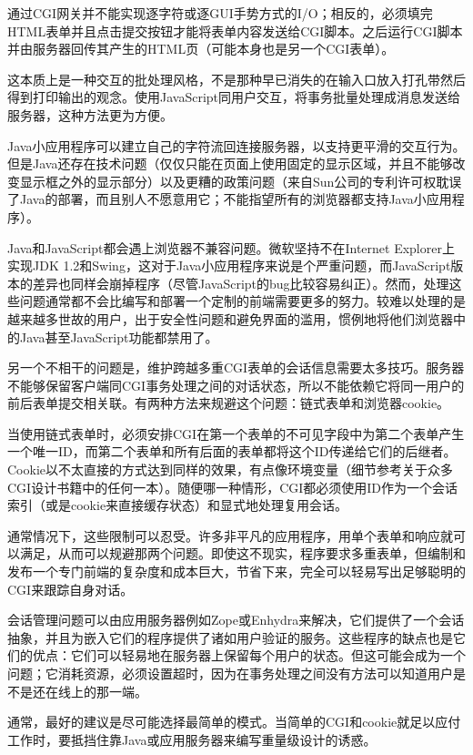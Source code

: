 \documentclass[12pt,oneside]{book}
\begin{document}
通过CGI网关并不能实现逐字符或逐GUI手势方式的I/O；相反的，必须填完HTML表单并且点击提交按钮才能将表单内容发送给CGI脚本。之后运行CGI脚本并由服务器回传其产生的HTML页（可能本身也是另一个CGI表单）。

这本质上是一种交互的批处理风格，不是那种早已消失的在输入口放入打孔带然后得到打印输出的观念。使用JavaScript同用户交互，将事务批量处理成消息发送给服务器，这种方法更为方便。

Java小应用程序可以建立自己的字符流回连接服务器，以支持更平滑的交互行为。但是Java还存在技术问题（仅仅只能在页面上使用固定的显示区域，并且不能够改变显示框之外的显示部分）以及更糟的政策问题（来自Sun公司的专利许可权耽误了Java的部署，而且别人不愿意用它；不能指望所有的浏览器都支持Java小应用程序）。

Java和JavaScript都会遇上浏览器不兼容问题。微软坚持不在Internet Explorer上实现JDK 1.2和Swing，这对于Java小应用程序来说是个严重问题，而JavaScript版本的差异也同样会崩掉程序（尽管JavaScript的bug比较容易纠正）。然而，处理这些问题通常都不会比编写和部署一个定制的前端需要更多的努力。较难以处理的是越来越多世故的用户，出于安全性问题和避免界面的滥用，惯例地将他们浏览器中的Java甚至JavaScript功能都禁用了。

另一个不相干的问题是，维护跨越多重CGI表单的会话信息需要太多技巧。服务器不能够保留客户端同CGI事务处理之间的对话状态，所以不能依赖它将同一用户的前后表单提交相关联。有两种方法来规避这个问题：链式表单和浏览器cookie。

当使用链式表单时，必须安排CGI在第一个表单的不可见字段中为第二个表单产生一个唯一ID，而第二个表单和所有后面的表单都将这个ID传递给它们的后继者。Cookie以不太直接的方式达到同样的效果，有点像环境变量（细节参考关于众多CGI设计书籍中的任何一本）。随便哪一种情形，CGI都必须使用ID作为一个会话索引（或是cookie来直接缓存状态）和显式地处理复用会话。

通常情况下，这些限制可以忍受。许多非平凡的应用程序，用单个表单和响应就可以满足，从而可以规避那两个问题。即使这不现实，程序要求多重表单，但编制和发布一个专门前端的复杂度和成本巨大，节省下来，完全可以轻易写出足够聪明的CGI来跟踪自身对话。

会话管理问题可以由应用服务器例如Zope或Enhydra来解决，它们提供了一个会话抽象，并且为嵌入它们的程序提供了诸如用户验证的服务。这些程序的缺点也是它们的优点：它们可以轻易地在服务器上保留每个用户的状态。但这可能会成为一个问题；它消耗资源，必须设置超时，因为在事务处理之间没有方法可以知道用户是不是还在线上的那一端。

通常，最好的建议是尽可能选择最简单的模式。当简单的CGI和cookie就足以应付工作时，要抵挡住靠Java或应用服务器来编写重量级设计的诱惑。
\end{document}
